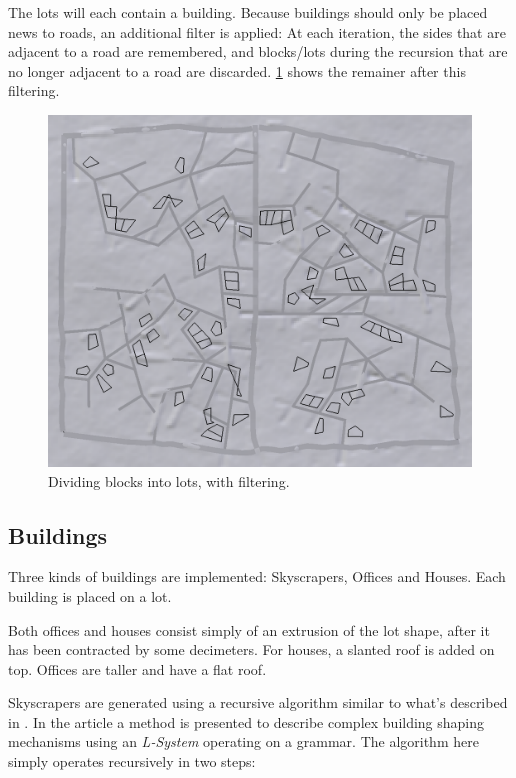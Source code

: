\documentclass[a4paper,12pt]{scrartcl}
\begin{document}
The lots will each contain a building. Because buildings should only be placed news to roads, an additional filter is applied: At each iteration, the sides that are adjacent to a road are remembered, and blocks/lots during the recursion that are no longer adjacent to a road are discarded. \ref{fig:lots} shows the remainer after this filtering.

\begin{figure}[h]
\center
\includegraphics[width=\textwidth]{lots.png}
\caption{Dividing blocks into lots, with filtering.}
\label{fig:lots}
\end{figure}


\subsection{Buildings}
Three kinds of buildings are implemented: Skyscrapers, Offices and Houses. Each building is placed on a lot.

Both offices and houses consist simply of an extrusion of the lot shape, after it has been contracted by some decimeters. For houses, a slanted roof is added on top. Offices are taller and have a flat roof.

Skyscrapers are generated using a recursive algorithm similar to what's described in \cite{Pari2001}. In the article a method is presented to describe complex building shaping mechanisms using an \emph{L-System} operating on a grammar. The algorithm here simply operates recursively in two steps:
\end{document}
